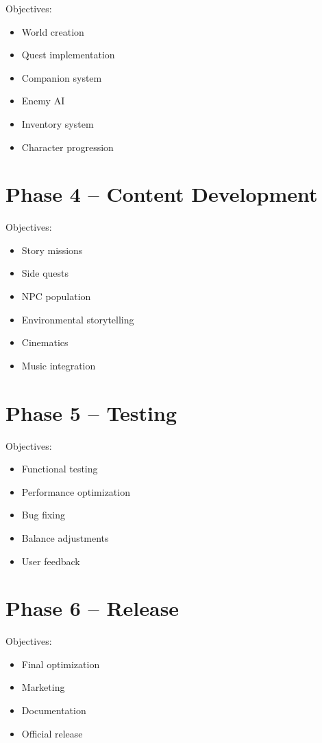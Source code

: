 Objectives:

\begin{itemize}
    \item World creation
    \item Quest implementation
    \item Companion system
    \item Enemy AI
    \item Inventory system
    \item Character progression
\end{itemize}

\section{Phase 4 -- Content Development}

Objectives:

\begin{itemize}
    \item Story missions
    \item Side quests
    \item NPC population
    \item Environmental storytelling
    \item Cinematics
    \item Music integration
\end{itemize}

\section{Phase 5 -- Testing}

Objectives:

\begin{itemize}
    \item Functional testing
    \item Performance optimization
    \item Bug fixing
    \item Balance adjustments
    \item User feedback
\end{itemize}

\section{Phase 6 -- Release}

Objectives:

\begin{itemize}
    \item Final optimization
    \item Marketing
    \item Documentation
    \item Official release
\end{itemize}

